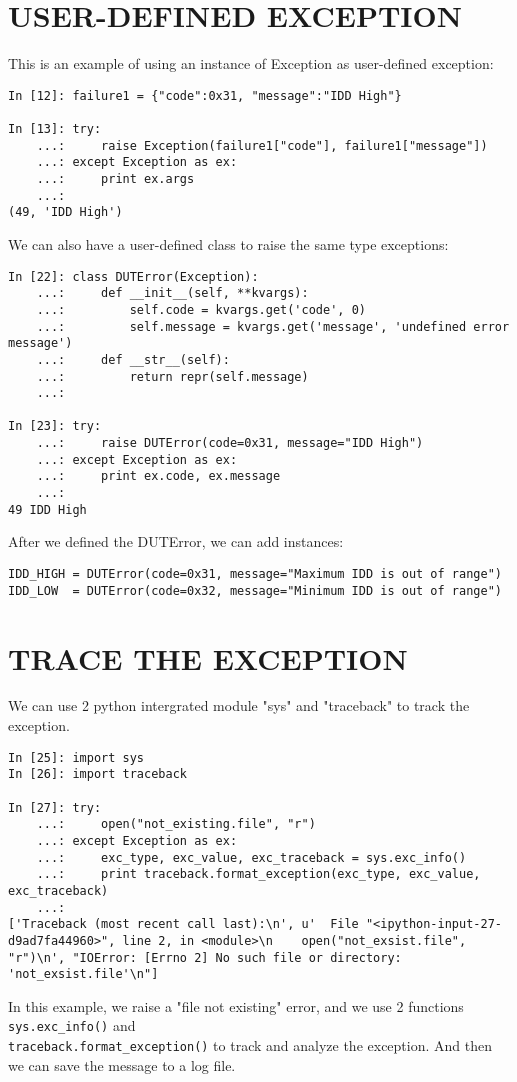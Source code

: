 \documentclass{article}
\begin{document}
\newpage
\section{USER-DEFINED EXCEPTION}
This is an example of using an instance of Exception as user-defined exception:
\begin{lstlisting}
In [12]: failure1 = {"code":0x31, "message":"IDD High"}

In [13]: try:
    ...:     raise Exception(failure1["code"], failure1["message"])
    ...: except Exception as ex:
    ...:     print ex.args
    ...: 
(49, 'IDD High')
\end{lstlisting}
We can also have a user-defined class to raise the same type exceptions:
\begin{lstlisting}
In [22]: class DUTError(Exception):
    ...:     def __init__(self, **kvargs):
    ...:         self.code = kvargs.get('code', 0)
    ...:         self.message = kvargs.get('message', 'undefined error message')
    ...:     def __str__(self):
    ...:         return repr(self.message)
    ...: 

In [23]: try:
    ...:     raise DUTError(code=0x31, message="IDD High")
    ...: except Exception as ex:
    ...:     print ex.code, ex.message
    ...: 
49 IDD High
\end{lstlisting}
After we defined the DUTError, we can add instances:
\begin{lstlisting}
IDD_HIGH = DUTError(code=0x31, message="Maximum IDD is out of range")
IDD_LOW  = DUTError(code=0x32, message="Minimum IDD is out of range")
\end{lstlisting}

\newpage
\section{TRACE THE EXCEPTION}
We can use 2 python intergrated module "sys" and "traceback" to track the exception.
\begin{lstlisting}
In [25]: import sys
In [26]: import traceback

In [27]: try:
    ...:     open("not_existing.file", "r")
    ...: except Exception as ex:
    ...:     exc_type, exc_value, exc_traceback = sys.exc_info()
    ...:     print traceback.format_exception(exc_type, exc_value, exc_traceback)
    ...: 
['Traceback (most recent call last):\n', u'  File "<ipython-input-27-d9ad7fa44960>", line 2, in <module>\n    open("not_exsist.file", "r")\n', "IOError: [Errno 2] No such file or directory: 'not_exsist.file'\n"]
\end{lstlisting}
In this example, we raise a "file not existing" error, and we use 2 functions \verb|sys.exc_info()| and \\ \verb|traceback.format_exception()| to track and analyze the exception.
And then we can save the message to a log file.
\end{document}
